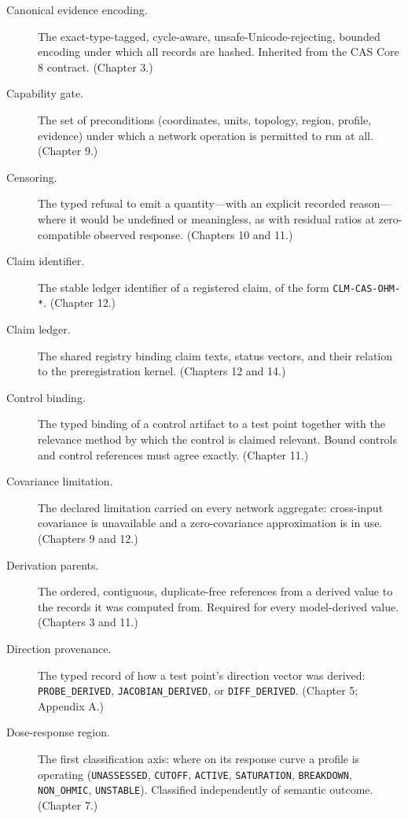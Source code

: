 \begin{description}
\item[Canonical evidence encoding.] The exact-type-tagged, cycle-aware, unsafe-Unicode-rejecting, bounded encoding under which all records are hashed. Inherited from the CAS Core 8 contract. (Chapter 3.)

\item[Capability gate.] The set of preconditions (coordinates, units, topology, region, profile, evidence) under which a network operation is permitted to run at all. (Chapter 9.)

\item[Censoring.] The typed refusal to emit a quantity---with an explicit recorded reason---where it would be undefined or meaningless, as with residual ratios at zero-compatible observed response. (Chapters 10 and 11.)

\item[Claim identifier.] The stable ledger identifier of a registered claim, of the form \texttt{CLM-CAS-OHM-*}. (Chapter 12.)

\item[Claim ledger.] The shared registry binding claim texts, status vectors, and their relation to the preregistration kernel. (Chapters 12 and 14.)

\item[Control binding.] The typed binding of a control artifact to a test point together with the relevance method by which the control is claimed relevant. Bound controls and control references must agree exactly. (Chapter 11.)

\item[Covariance limitation.] The declared limitation carried on every network aggregate: cross-input covariance is unavailable and a zero-covariance approximation is in use. (Chapters 9 and 12.)

\item[Derivation parents.] The ordered, contiguous, duplicate-free references from a derived value to the records it was computed from. Required for every model-derived value. (Chapters 3 and 11.)

\item[Direction provenance.] The typed record of how a test point's direction vector was derived: \texttt{PROBE\_DERIVED}, \texttt{JACOBIAN\_DERIVED}, or \texttt{DIFF\_DERIVED}. (Chapter 5; Appendix A.)

\item[Dose-response region.] The first classification axis: where on its response curve a profile is operating (\texttt{UNASSESSED}, \texttt{CUTOFF}, \texttt{ACTIVE}, \texttt{SATURATION}, \texttt{BREAKDOWN}, \texttt{NON\_OHMIC}, \texttt{UNSTABLE}). Classified independently of semantic outcome. (Chapter 7.)


\end{description}
